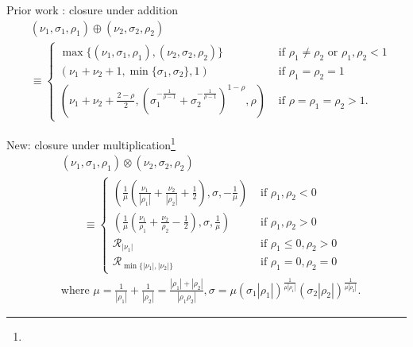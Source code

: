 \begin{frame}{Prior work \parencite{resnick2007heavy}: closure under addition}
    \begin{align*}
        &  (\nu_{1},\sigma_{1},\rho_{1})\oplus(\nu_{2},\sigma_{2},\rho_{2}) \\
        & \equiv \begin{cases}
            \max\{(\nu_{1},\sigma_{1},\rho_{1}),(\nu_{2},\sigma_{2},\rho_{2})\} & \text{ if }\rho_{1}\neq\rho_{2}\text{ or }\rho_{1},\rho_{2}<1\\
            \left(\nu_{1}+\nu_{2}+1,\min\{\sigma_{1},\sigma_{2}\},1\right) & \text{ if }\rho_{1}=\rho_{2}=1\\
            (\nu_{1}+\nu_{2}+\frac{2-\rho}{2},(\sigma_{1}^{-\frac{1}{\rho-1}}+\sigma_{2}^{-\frac{1}{\rho-1}})^{1-\rho},\rho) & \text{ if }\rho=\rho_{1}=\rho_{2}>1.
        \end{cases}
    \end{align*}
\end{frame}

\begin{frame}{New: closure under multiplication\footnote{}}
    \begin{align*}
        & (\nu_{1},\sigma_{1},\rho_{1})\otimes(\nu_{2},\sigma_{2},\rho_{2}) \\
        &\qquad \equiv\begin{cases}
        \left(\frac{1}{\mu}\left(\frac{\nu_{1}}{|\rho_{1}|}+\frac{\nu_{2}}{|\rho_{2}|}+\frac{1}{2}\right),\sigma,-\frac{1}{\mu}\right) & \text{ if }\rho_{1},\rho_{2}<0\\
        \left(\frac{1}{\mu}\left(\frac{\nu_{1}}{\rho_{1}}+\frac{\nu_{2}}{\rho_{2}}-\frac{1}{2}\right),\sigma,\frac{1}{\mu}\right) & \text{ if }\rho_{1},\rho_{2}>0\\
        \mathcal{R}_{|\nu_1|} & \mbox{ if }\rho_{1}\leq0,\rho_{2}>0 \\
        \mathcal{R}_{\min\{|\nu_1|,|\nu_2|\}} & \mbox{ if }\rho_{1}=0,\rho_{2}=0
        \end{cases} \\
        &\text{where }\mu=\frac{1}{|\rho_{1}|}+\frac{1}{|\rho_{2}|}=\frac{|\rho_{1}|+|\rho_{2}|}{|\rho_{1}\rho_{2}|}, \sigma=\mu(\sigma_{1}|\rho_{1}|)^{\frac{1}{\mu|\rho_{1}|}}(\sigma_{2}|\rho_{2}|)^{\frac{1}{\mu|\rho_{2}|}}.
    \end{align*}
\end{frame}

